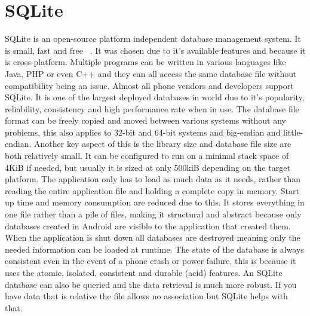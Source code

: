 \section{SQLite}
SQLite is an open-source platform independent database management system. It is small, fast and free ~\cite{sqlite}. It was chosen due to it's available features and because it is cross-platform. Multiple programs can be written in various languages like Java, PHP or even C++ and they can all access the same database file without compatibility being an issue. Almost all phone vendors and developers support SQLite. It is one of the largest deployed databases in world due to it's popularity, reliability, consistency and high performance rate when in use. The database file format can be freely copied and moved between various systems without any problems, this also applies to 32-bit and 64-bit systems and big-endian and little-endian. Another key aspect of this is the library size and database file size are both relatively small. It can be configured to run on a minimal stack space of 4KiB if needed, but usually it is sized at only 500kiB depending on the target platform. The application only has to load as much data as it needs, rather than reading the entire application file and holding a complete copy in memory. Start up time and memory consumption are reduced due to this. It stores everything in one file rather than a pile of files, making it structural and abstract because only databases created in Android are visible to the application that created them. When the application is shut down all databases are destroyed meaning only the needed information can be loaded at runtime. The state of the database is always consistent even in the event of a phone crash or power failure, this is because it uses the atomic, isolated, consistent and durable (acid) features. An SQLite database can also be queried and the data retrieval is much more robust. If you have data that is relative the file allows no association but SQLite helps with that.

\pagebreak
